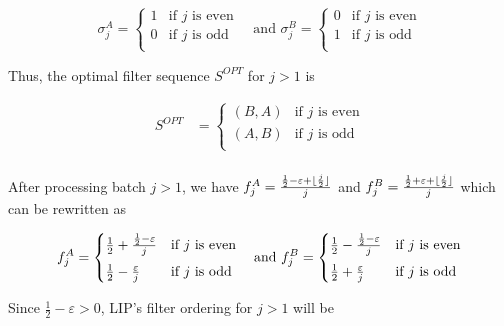 \begin{equation*}
\sigma_j^A = 
    \begin{cases}
    1 & \text{if $j$ is even} \\[0.5em]
    0 & \text{if $j$ is odd} \\
    \end{cases} \quad \text{and }
\sigma_j^B = 
    \begin{cases}
    0 & \text{if $j$ is even} \\[0.5em]
    1 &  \text{if $j$ is odd} \\
    \end{cases}
\end{equation*}

Thus, the optimal filter sequence $S^{OPT}$ for $j > 1$ is 

\begin{align*}
S^{OPT} &= 
    \begin{cases}
    (B, A) & \text{if $j$ is even} \\[0.5em]
    (A, B) & \text{if $j$ is odd} \\
    \end{cases}\\[0.5em]
\end{align*}

\DeclarePairedDelimiter\floor{\lfloor}{\rfloor}
After processing batch $j > 1$, we have 
$f_j^A = \frac{\frac{1}{2} - \varepsilon + \floor{\frac{j}{2}}}{j}$ 
and 
$f_j^B = \frac{\frac{1}{2} + \varepsilon + \floor{\frac{j}{2}}}{j}$  
which can be rewritten as

\begin{equation*}
f_j^A = 
    \begin{cases}
    \frac{1}{2} + \frac{\frac{1}{2}-\varepsilon}{j} & \text{if $j$ is even} \\[0.5em]
    \frac{1}{2} - \frac{\varepsilon}{j} &  \text{if $j$ is odd} \\
    \end{cases}  \quad \text{and }
f_j^B = 
    \begin{cases}
    \frac{1}{2} - \frac{\frac{1}{2}-\varepsilon}{j} & \text{if $j$ is even} \\[0.5em]
    \frac{1}{2} + \frac{\varepsilon}{j} &  \text{if $j$ is odd} \\
    \end{cases}\\[0.5em]
\end{equation*}

Since $\frac{1}{2} - \varepsilon > 0$, LIP's filter ordering for $j > 1$ will be

